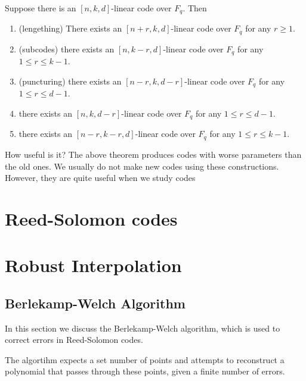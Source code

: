 \begin{theorem}
    Suppose there is an $[n, k, d]$-linear code over $F_q$. Then
    \begin{enumerate}
        \item (lengething) There exists an $[n + r, k, d]$-linear code over 
        $F_q$ for any $r \ge 1$.

        \item (subcodes) there exists an $[n, k-r, d]$-linear code over $F_q$ for any 
        $1 \le r \le k- 1$.

        \item (puncturing) there exists an $[n- r, k, d- r]$-linear code over $F_q$ for any
        $1 \le r \le d- 1$.

        \item there exists an $[n, k, d- r]$-linear code over $F_q$ for any $1 \le r \le d- 1$.
        
        \item there exists an $[n- r, k- r, d]$-linear code over $F_q$ for any $1 \le r \le k- 1$.
    \end{enumerate}
\end{theorem}

\begin{bclogo}[couleur=blue!10, arrondi=0.1, logo=\bcinfo]{How useful is it?}
The above theorem produces codes with worse
parameters than the old ones. We usually do not make new codes using these
constructions. However, they are quite useful when we study codes
\end{bclogo}


\section{Reed-Solomon codes}


\section{Robust Interpolation}
\subsection{Berlekamp-Welch Algorithm}
In this section we discuss the Berlekamp-Welch algorithm, 
which is used to correct errors in Reed-Solomon codes.

The algortihm expects a set number of points and attempts to reconstruct 
a polynomial that passes through these points, given a finite number of errors.

